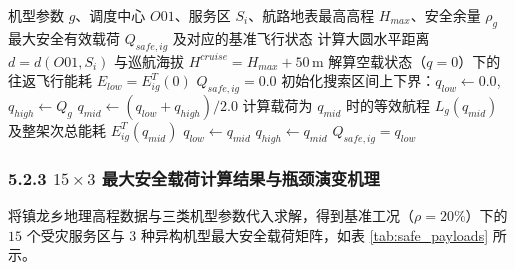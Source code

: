 \documentclass[12pt,a4paper,UTF8]{ctexart}
\begin{document}
\begin{algorithm}[H]
\caption{基于物理能耗二分搜索的最大安全载荷解算算法}
\label{alg:bisection}
\begin{algorithmic}[1]
\Require 机型参数 $g$、调度中心 $O01$、服务区 $S_i$、航路地表最高高程 $H_{max}$、安全余量 $\rho_g$
\Ensure 最大安全有效载荷 $Q_{safe, ig}$ 及对应的基准飞行状态
\State 计算大圆水平距离 $d = d(O01, S_i)$ 与巡航海拔 $H^{cruise} = H_{max} + 50\,\text{m}$
\State 解算空载状态（$q=0$）下的往返飞行能耗 $E_{low} = E_{ig}^T(0)$
    \State \Return $Q_{safe, ig} = 0.0$ 
\EndIf
\State 初始化搜索区间上下界：$q_{low} \gets 0.0$, $q_{high} \gets Q_g$
    \State $q_{mid} \gets (q_{low} + q_{high}) / 2.0$
    \State 计算载荷为 $q_{mid}$ 时的等效航程 $L_g(q_{mid})$ 及整架次总能耗 $E_{ig}^T(q_{mid})$
        \State $q_{low} \gets q_{mid}$ 
    \Else
        \State $q_{high} \gets q_{mid}$ 
    \EndIf
\EndFor
\State \Return $Q_{safe, ig} = q_{low}$
\end{algorithmic}
\end{algorithm}

\subsubsection{5.2.3 $15\times 3$ 最大安全载荷计算结果与瓶颈演变机理}
将镇龙乡地理高程数据与三类机型参数代入求解，得到基准工况（$\rho=20\%$）下的 $15$ 个受灾服务区与 $3$ 种异构机型最大安全载荷矩阵，如表 \ref{tab:safe_payloads} 所示。
\end{document}
